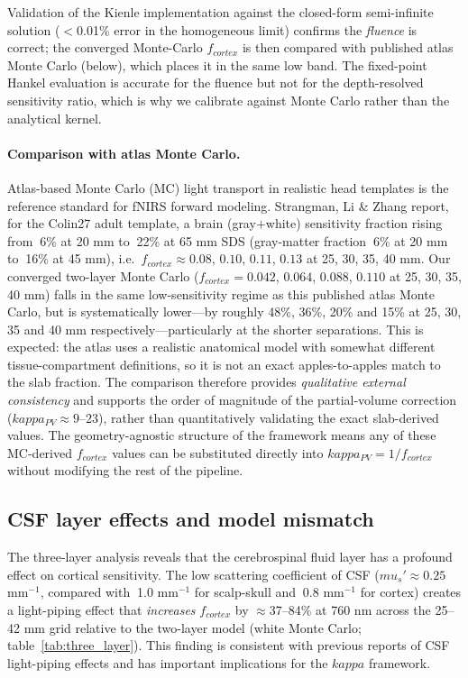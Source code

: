 \documentclass[11pt]{article}
\def\kappa{kappa}%
\def\mu{mu}%
\def\sim{~}%
\def\mathrm#1{#1}%
\def\,{ }%
\begin{document}
Validation of the Kienle implementation against the closed-form semi-infinite solution ($<$0.01\% error in the homogeneous limit) confirms the \emph{fluence} is correct; the converged Monte-Carlo $f_{\mathrm{cortex}}$ is then compared with published atlas Monte Carlo (below), which places it in the same low band. The fixed-point Hankel evaluation is accurate for the fluence but not for the depth-resolved sensitivity ratio, which is why we calibrate against Monte Carlo rather than the analytical kernel.

\paragraph{Comparison with atlas Monte Carlo.}
\label{sec:atlas_compare}
Atlas-based Monte Carlo (MC) light transport in realistic head templates is the reference standard for fNIRS forward modeling. Strangman, Li \& Zhang\cite{r10} report, for the Colin27 adult template, a brain (gray$+$white) sensitivity fraction rising from $\sim$6\% at 20\,mm to $\sim$22\% at 65\,mm SDS (gray-matter fraction $\sim$6\% at 20\,mm to $\sim$16\% at 45\,mm), i.e.\ $f_{\mathrm{cortex}} \approx 0.08$, $0.10$, $0.11$, $0.13$ at 25, 30, 35, 40\,mm. Our converged two-layer Monte Carlo ($f_{\mathrm{cortex}} = 0.042$, $0.064$, $0.088$, $0.110$ at 25, 30, 35, 40\,mm) falls in the same low-sensitivity regime as this published atlas Monte Carlo, but is systematically lower---by roughly 48\%, 36\%, 20\% and 15\% at 25, 30, 35 and 40\,mm respectively---particularly at the shorter separations. This is expected: the atlas uses a realistic anatomical model with somewhat different tissue-compartment definitions, so it is not an exact apples-to-apples match to the slab fraction. The comparison therefore provides \emph{qualitative external consistency} and supports the order of magnitude of the partial-volume correction ($\kappa_{\mathrm{PV}}\approx9$--$23$), rather than quantitatively validating the exact slab-derived values. The geometry-agnostic structure of the framework means any of these MC-derived $f_{\mathrm{cortex}}$ values can be substituted directly into $\kappa_{\mathrm{PV}} = 1/f_{\mathrm{cortex}}$ without modifying the rest of the pipeline.

\subsection{CSF layer effects and model mismatch}

The three-layer analysis reveals that the cerebrospinal fluid layer has a profound effect on cortical sensitivity. The low scattering coefficient of CSF ($\mu_s' \approx 0.25$\,mm$^{-1}$, compared with $\sim$1.0\,mm$^{-1}$ for scalp-skull and $\sim$0.8\,mm$^{-1}$ for cortex) creates a light-piping effect that \textit{increases} $f_{\mathrm{cortex}}$ by $\approx$37--84\% at 760\,nm across the 25--42\,mm grid relative to the two-layer model (white Monte Carlo; table~\ref{tab:three_layer}). This finding is consistent with previous reports of CSF light-piping effects\cite{r12} and has important implications for the $\kappa$ framework.
\end{document}
